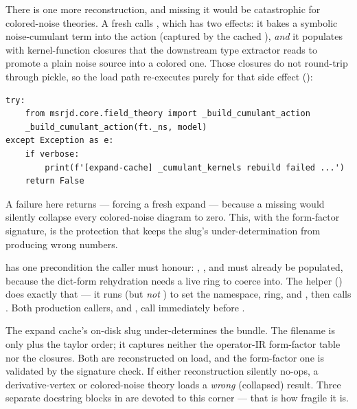 There is one more reconstruction, and missing it would be catastrophic for
colored-noise theories. A fresh  calls
, which has two effects: it bakes a symbolic
noise-cumulant term into the action (captured by the cached ),
\emph{and} it populates  with kernel-function
closures that the downstream type extractor reads to promote a plain noise
source into a colored one. Those closures do not round-trip through pickle, so
the load path re-executes  purely for that side
effect ():

\begin{lstlisting}
try:
    from msrjd.core.field_theory import _build_cumulant_action
    _build_cumulant_action(ft._ns, model)
except Exception as e:
    if verbose:
        print(f'[expand-cache] _cumulant_kernels rebuild failed ...')
    return False
\end{lstlisting}

A failure here returns  --- forcing a fresh expand --- because a
missing  would silently collapse every colored-noise
diagram to zero. This, with the form-factor signature, is the protection that
keeps the slug's under-determination from producing wrong numbers.

 has one precondition the caller must honour:
, , and  must already be
populated, because the dict-form rehydration needs a live ring to coerce into.
The helper  ()
does exactly that --- it runs  (but \emph{not}
) to set the namespace, ring, and , then calls
. Both production callers,
 and , call 
immediately before .

\begin{gotcha}
The expand cache's on-disk slug under-determines the bundle. The filename is
only  plus the taylor order; it captures neither the
operator-IR form-factor table nor the  closures. Both
are reconstructed on load, and the form-factor one is validated by the
signature check. If either reconstruction silently no-ops, a derivative-vertex
or colored-noise theory loads a \emph{wrong} (collapsed) result. Three separate
docstring blocks in  are devoted to this corner ---
that is how fragile it is.
\end{gotcha}

